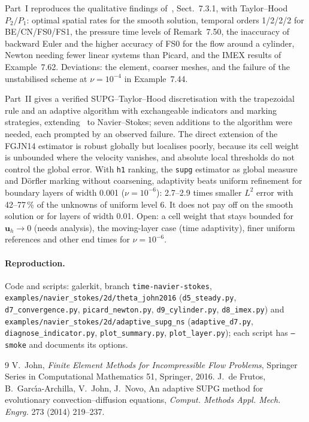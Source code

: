 \documentclass[11pt,a4paper]{article}
\newcommand{\bu}{\boldsymbol{u}}
\newcommand{\code}[1]{\texttt{#1}}
\begin{document}
Part~I reproduces the qualitative findings of~\cite{John2016}, Sect.~7.3.1, with Taylor--Hood $P_2/P_1$: optimal spatial
rates for the smooth solution, temporal orders 1/2/2/2 for BE/CN/FS0/FS1, the pressure time levels of Remark~7.50, the
inaccuracy of backward Euler and the higher accuracy of FS0 for the flow around a cylinder, Newton needing fewer linear
systems than Picard, and the IMEX results of Example~7.62. Deviations: the element, coarser meshes, and the failure of the
unstabilised scheme at $\nu=10^{-4}$ in Example~7.44.

Part~II gives a verified SUPG--Taylor--Hood discretisation with the trapezoidal rule and an adaptive algorithm with
exchangeable indicators and marking strategies, extending~\cite{FGJN14} to Navier--Stokes; seven additions to the
algorithm were needed, each prompted by an observed failure. The direct extension of the FGJN14 estimator is robust
globally but localises poorly, because its cell weight is unbounded where the velocity vanishes, and absolute local
thresholds do not control the global error. With \code{h1} ranking, the \code{supg} estimator as global measure and
D\"orfler marking without coarsening, adaptivity beats uniform refinement for boundary layers of width 0.001
($\nu=10^{-6}$): 2.7--2.9 times smaller $L^2$ error with 42--77\,\% of the unknowns of uniform level 6. It does not pay off
on the smooth solution or for layers of width 0.01. Open: a cell weight that stays bounded for $\bu_h\to0$ (needs
analysis), the moving-layer case (time adaptivity), finer uniform references and other end times for $\nu=10^{-6}$.

\paragraph{Reproduction.} {\sloppy Code and scripts: galerkit, branch \code{time-navier-stokes},
\code{examples/\allowbreak navier\_stokes/\allowbreak 2d/\allowbreak theta\_john2016} (\code{d5\_steady.py}, \code{d7\_convergence.py}, \code{picard\_newton.py},
\code{d9\_cylinder.py}, \code{d8\_imex.py}) and \code{examples/\allowbreak navier\_stokes/\allowbreak 2d/\allowbreak adaptive\_supg\_ns} (\code{adaptive\_d7.py},
\code{diagnose\_indicator.py}, \code{plot\_summary.py}, \code{plot\_layer.py}); each script has \code{--smoke} and documents its options.\par}

\begin{thebibliography}{9}
 V.~John, \emph{Finite Element Methods for Incompressible Flow Problems}, Springer Series in
Computational Mathematics 51, Springer, 2016.
 J.~de Frutos, B.~Garc\'{\i}a-Archilla, V.~John, J.~Novo, An adaptive SUPG method for evolutionary
convection--diffusion equations, \emph{Comput. Methods Appl. Mech. Engrg.} 273 (2014) 219--237.
\end{thebibliography}
\end{document}
